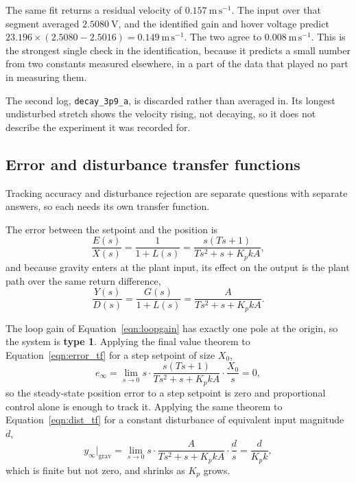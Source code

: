 The same fit returns a residual velocity of $0.157\ \mathrm{m\,s^{-1}}$. The input over that
segment averaged $2.5080\ \mathrm{V}$, and the identified gain and hover voltage predict
$23.196 \times (2.5080 - 2.5016) = 0.149\ \mathrm{m\,s^{-1}}$. The two agree to
$0.008\ \mathrm{m\,s^{-1}}$. This is the strongest single check in the identification, because it
predicts a small number from two constants measured elsewhere, in a part of the data that played no
part in measuring them.

The second log, \texttt{decay\_3p9\_a}, is discarded rather than averaged in. Its longest
undisturbed stretch shows the velocity rising, not decaying, so it does not describe the experiment
it was recorded for.

\subsection{Error and disturbance transfer functions}
Tracking accuracy and disturbance rejection are separate questions with separate answers, so
each needs its own transfer function.

The error between the setpoint and the position is
\begin{equation}\label{eqn:error_tf}
    \frac{E(s)}{X(s)} = \frac{1}{1 + L(s)} = \frac{s(Ts + 1)}{Ts^2 + s + K_p k A} ,
\end{equation}
and because gravity enters at the plant input, its effect on the output is the plant path over
the same return difference,
\begin{equation}\label{eqn:dist_tf}
    \frac{Y(s)}{D(s)} = \frac{G(s)}{1 + L(s)} = \frac{A}{Ts^2 + s + K_p k A} .
\end{equation}

The loop gain of Equation~\eqref{eqn:loopgain} has exactly one pole at the origin, so the system
is \textbf{type 1}. Applying the final value theorem to Equation~\eqref{eqn:error_tf} for a step
setpoint of size $X_0$,
\begin{equation}\label{eqn:fvt_error}
    e_\infty = \lim_{s \to 0} s \cdot \frac{s(Ts+1)}{Ts^2 + s + K_p k A} \cdot \frac{X_0}{s} = 0 ,
\end{equation}
so the steady-state position error to a step setpoint is zero and proportional control alone is
enough to track it. Applying the same theorem to Equation~\eqref{eqn:dist_tf} for a constant
disturbance of equivalent input magnitude $d$,
\begin{equation}\label{eqn:fvt_dist}
    y_\infty\big|_{\text{grav}}
    = \lim_{s \to 0} s \cdot \frac{A}{Ts^2 + s + K_p k A} \cdot \frac{d}{s}
    = \frac{d}{K_p k} ,
\end{equation}
which is finite but not zero, and shrinks as $K_p$ grows.

